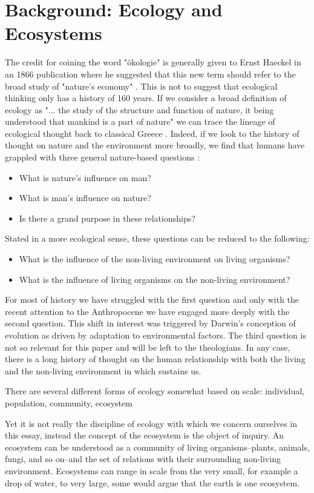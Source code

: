 \section {Background: Ecology and Ecosystems}

The credit for coining the word "ökologie" is generally given to Ernst Haeckel in an 1866 publication where he suggested that this new term should refer to the broad study of "nature's economy" \cite{worster_1977}. This is not to suggest that ecological thinking only has a history of 160 years. If we consider a broad definition of ecology as "... the study of the structure and function of nature, it being understood that mankind is a part of nature" we can trace the lineage of ecological thought back to classical Greece \cite{odum_1953}. Indeed, if we look to the history of thought on nature and the environment more broadly, we find that humans have grappled with three general nature-based questions \cite{glacken_1967}: \begin{itemize} \item What is nature's influence on man? \item What is man's influence on nature? \item Is there a grand purpose in these relationships? \end{itemize} Stated in a more ecological sense, these questions can be reduced to the following: \begin{itemize} \item What is the influence of the non-living environment on living organisms? \item What is the influence of living organisms on the non-living environment? \end{itemize} For most of history we have struggled with the first question and only with the recent attention to the Anthropocene we have engaged more deeply with the second question. This shift in interest was triggered by Darwin's conception of evolution as driven by adaptation to environmental factors. The third question is not so relevant for this paper and will be left to the theologians. In any case, there is a long history of thought on the human relationship with both the living and the non-living environment in which sustains us.

There are several different forms of ecology somewhat based on scale: individual, population, community, ecosystem 

Yet it is not really the discipline of ecology with which we concern ourselves in this essay, instead the concept of the ecosystem is the object of inquiry. An ecosystem can be understood as a community of living organisms--plants, animals, fungi, and so on--and the set of relations with their surrounding non-living environment. Ecosystems can range in scale from the very small, for example a drop of water, to very large, some would argue that the earth is one ecosystem.

